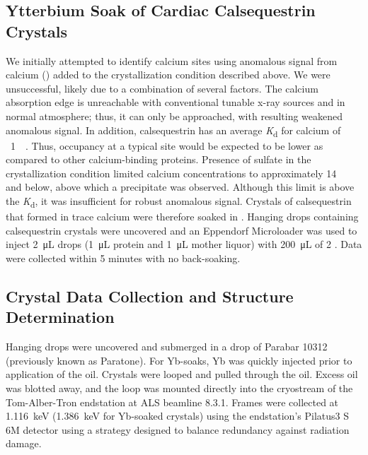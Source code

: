 \subsection*{Ytterbium Soak of Cardiac Calsequestrin Crystals}
We initially attempted to identify calcium sites using anomalous signal from calcium () added to the crystallization condition described above. We were unsuccessful, likely due to a combination of several factors. The calcium absorption edge is unreachable with conventional tunable x-ray sources and in normal atmosphere; thus, it can only be approached, with resulting weakened anomalous signal. In addition, calsequestrin has an average \textit{K}\textsubscript{d} for calcium of ~\SI{1}{\milli\Molar}. Thus, occupancy at a typical site would be expected to be lower as compared to other calcium-binding proteins. Presence of sulfate in the crystallization condition limited calcium concentrations to approximately \SI{14}{\milli\Molar} and below, above which a precipitate was observed. Although this limit is above the \textit{K}\textsubscript{d}, it was insufficient for robust anomalous signal. Crystals of calsequestrin that formed in trace calcium were therefore soaked in . Hanging drops containing calsequestrin crystals were uncovered and an Eppendorf Microloader was used to inject \SI{2}{\micro\liter} drops (\SI{1}{\micro\liter} protein and \SI{1}{\micro\liter} mother liquor) with \SI{200}{\micro\liter} of \SI{2}{\Molar} . Data were collected within 5 minutes with no back-soaking.

\subsection*{Crystal Data Collection and Structure Determination}
Hanging drops were uncovered and submerged in a drop of Parabar 10312 (previously known as Paratone). For Yb-soaks, Yb was quickly injected prior to application of the oil. Crystals were looped and pulled through the oil. Excess oil was blotted away, and the loop was mounted directly into the cryostream of the Tom-Alber-Tron endstation at ALS beamline 8.3.1. Frames were collected at \SI{1.116}{\keV} (\SI{1.386}{\keV} for Yb-soaked crystals) using the endstation's Pilatus3 S 6M detector using a strategy designed to balance redundancy against radiation damage. 

